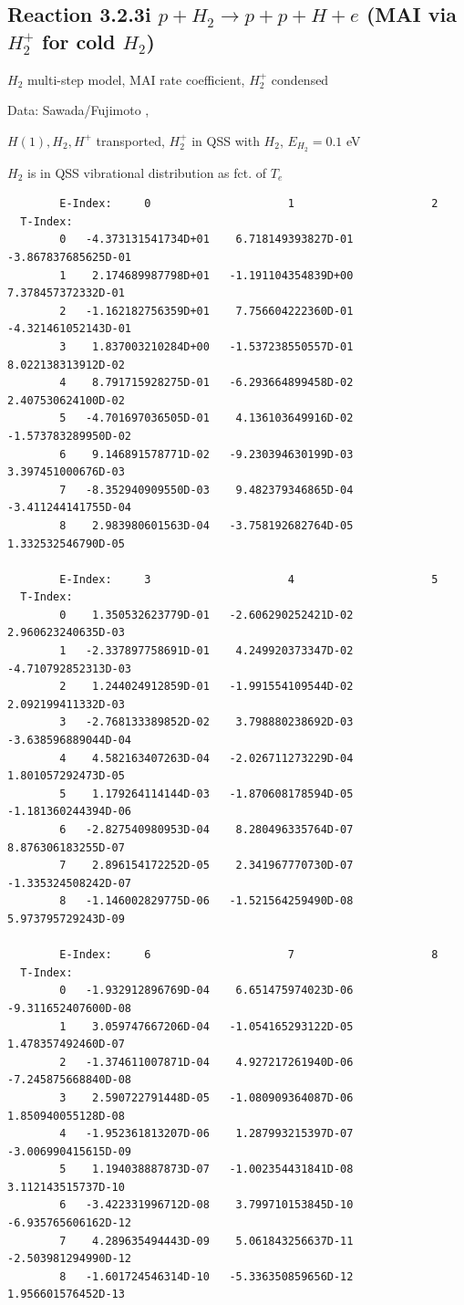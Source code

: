 \documentclass[12pt,dvips]{article}
\begin{document}
\subsection{
Reaction 3.2.3i   $p + H_2   \rightarrow p + p + H +e $ (MAI via $H_2^+$ for cold $H_2$)
}

$H_2$ multi-step model, MAI rate coefficient, $H_2^+$ condensed

 Data: Sawada/Fujimoto ,\cite{kn:Sawada}

$  H(1), H_2, H^+ $ transported, $H_2^+$ in QSS with $H_2$, $E_{H_2}=0.1$ eV


$H_2$ is in QSS vibrational distribution as fct. of $T_e$


\begin{small}\begin{verbatim}
        E-Index:     0                     1                     2
  T-Index:
        0   -4.373131541734D+01    6.718149393827D-01   -3.867837685625D-01
        1    2.174689987798D+01   -1.191104354839D+00    7.378457372332D-01
        2   -1.162182756359D+01    7.756604222360D-01   -4.321461052143D-01
        3    1.837003210284D+00   -1.537238550557D-01    8.022138313912D-02
        4    8.791715928275D-01   -6.293664899458D-02    2.407530624100D-02
        5   -4.701697036505D-01    4.136103649916D-02   -1.573783289950D-02
        6    9.146891578771D-02   -9.230394630199D-03    3.397451000676D-03
        7   -8.352940909550D-03    9.482379346865D-04   -3.411244141755D-04
        8    2.983980601563D-04   -3.758192682764D-05    1.332532546790D-05

        E-Index:     3                     4                     5
  T-Index:
        0    1.350532623779D-01   -2.606290252421D-02    2.960623240635D-03
        1   -2.337897758691D-01    4.249920373347D-02   -4.710792852313D-03
        2    1.244024912859D-01   -1.991554109544D-02    2.092199411332D-03
        3   -2.768133389852D-02    3.798880238692D-03   -3.638596889044D-04
        4    4.582163407263D-04   -2.026711273229D-04    1.801057292473D-05
        5    1.179264114144D-03   -1.870608178594D-05   -1.181360244394D-06
        6   -2.827540980953D-04    8.280496335764D-07    8.876306183255D-07
        7    2.896154172252D-05    2.341967770730D-07   -1.335324508242D-07
        8   -1.146002829775D-06   -1.521564259490D-08    5.973795729243D-09

        E-Index:     6                     7                     8
  T-Index:
        0   -1.932912896769D-04    6.651475974023D-06   -9.311652407600D-08
        1    3.059747667206D-04   -1.054165293122D-05    1.478357492460D-07
        2   -1.374611007871D-04    4.927217261940D-06   -7.245875668840D-08
        3    2.590722791448D-05   -1.080909364087D-06    1.850940055128D-08
        4   -1.952361813207D-06    1.287993215397D-07   -3.006990415615D-09
        5    1.194038887873D-07   -1.002354431841D-08    3.112143515737D-10
        6   -3.422331996712D-08    3.799710153845D-10   -6.935765606162D-12
        7    4.289635494443D-09    5.061843256637D-11   -2.503981294990D-12
        8   -1.601724546314D-10   -5.336350859656D-12    1.956601576452D-13


\end{verbatim}
\end{small}
\end{document}
